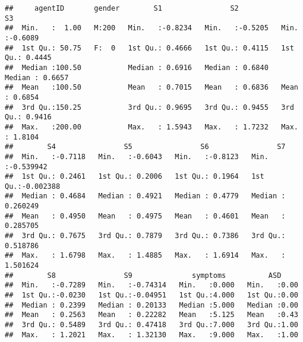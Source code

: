\documentclass[]{article}
\newenvironment{Shaded}{\begin{snugshade}}{\end{snugshade}}
\newcommand{\KeywordTok}[1]{\textcolor[rgb]{0.13,0.29,0.53}{\textbf{#1}}}
\newcommand{\DecValTok}[1]{\textcolor[rgb]{0.00,0.00,0.81}{#1}}
\newcommand{\StringTok}[1]{\textcolor[rgb]{0.31,0.60,0.02}{#1}}
\newcommand{\CommentTok}[1]{\textcolor[rgb]{0.56,0.35,0.01}{\textit{#1}}}
\newcommand{\OperatorTok}[1]{\textcolor[rgb]{0.81,0.36,0.00}{\textbf{#1}}}
\newcommand{\NormalTok}[1]{#1}
\begin{document}
\begin{verbatim}
##     agentID       gender        S1                S2                S3         
##  Min.   :  1.00   M:200   Min.   :-0.8234   Min.   :-0.5205   Min.   :-0.6089  
##  1st Qu.: 50.75   F:  0   1st Qu.: 0.4666   1st Qu.: 0.4115   1st Qu.: 0.4445  
##  Median :100.50           Median : 0.6916   Median : 0.6840   Median : 0.6657  
##  Mean   :100.50           Mean   : 0.7015   Mean   : 0.6836   Mean   : 0.6854  
##  3rd Qu.:150.25           3rd Qu.: 0.9695   3rd Qu.: 0.9455   3rd Qu.: 0.9416  
##  Max.   :200.00           Max.   : 1.5943   Max.   : 1.7232   Max.   : 1.8104  
##        S4                S5                S6                S7           
##  Min.   :-0.7118   Min.   :-0.6043   Min.   :-0.8123   Min.   :-0.539942  
##  1st Qu.: 0.2461   1st Qu.: 0.2006   1st Qu.: 0.1964   1st Qu.:-0.002388  
##  Median : 0.4684   Median : 0.4921   Median : 0.4779   Median : 0.260249  
##  Mean   : 0.4950   Mean   : 0.4975   Mean   : 0.4601   Mean   : 0.285705  
##  3rd Qu.: 0.7675   3rd Qu.: 0.7879   3rd Qu.: 0.7386   3rd Qu.: 0.518786  
##  Max.   : 1.6798   Max.   : 1.4885   Max.   : 1.6914   Max.   : 1.501624  
##        S8                S9              symptoms          ASD      
##  Min.   :-0.7289   Min.   :-0.74314   Min.   :0.000   Min.   :0.00  
##  1st Qu.:-0.0230   1st Qu.:-0.04951   1st Qu.:4.000   1st Qu.:0.00  
##  Median : 0.2399   Median : 0.20133   Median :5.000   Median :0.00  
##  Mean   : 0.2563   Mean   : 0.22282   Mean   :5.125   Mean   :0.43  
##  3rd Qu.: 0.5489   3rd Qu.: 0.47418   3rd Qu.:7.000   3rd Qu.:1.00  
##  Max.   : 1.2021   Max.   : 1.32130   Max.   :9.000   Max.   :1.00
\end{verbatim}

\begin{Shaded}
\end{Shaded}
\end{document}

